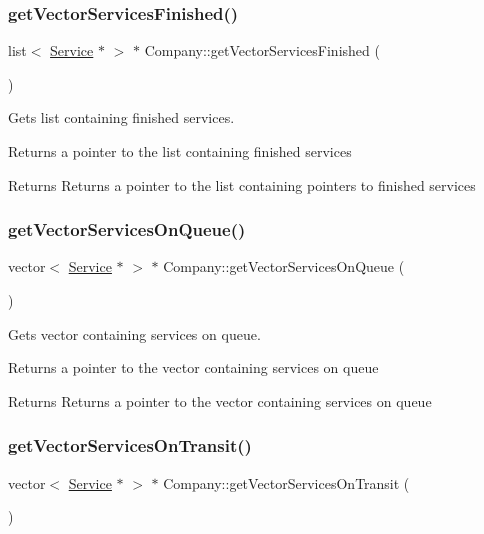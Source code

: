\subsubsection{\texorpdfstring{get\+Vector\+Services\+Finished()}{getVectorServicesFinished()}}
{\footnotesize\ttfamily list$<$ \hyperlink{class_service}{Service} $\ast$ $>$ $\ast$ Company\+::get\+Vector\+Services\+Finished (\begin{DoxyParamCaption}{ }\end{DoxyParamCaption})}



Gets list containing finished services. 

Returns a pointer to the list containing finished services

\begin{DoxyReturn}{Returns}
Returns a pointer to the list containing pointers to finished services 
\end{DoxyReturn}
\mbox{\label{class_company_adffe3680413d999c922858c88fbd18a6}} 
\subsubsection{\texorpdfstring{get\+Vector\+Services\+On\+Queue()}{getVectorServicesOnQueue()}}
{\footnotesize\ttfamily vector$<$ \hyperlink{class_service}{Service} $\ast$ $>$ $\ast$ Company\+::get\+Vector\+Services\+On\+Queue (\begin{DoxyParamCaption}{ }\end{DoxyParamCaption})}



Gets vector containing services on queue. 

Returns a pointer to the vector containing services on queue

\begin{DoxyReturn}{Returns}
Returns a pointer to the vector containing services on queue 
\end{DoxyReturn}
\mbox{\label{class_company_ab83ddbd16558f0e99efa7c56878e0ec8}} 
\subsubsection{\texorpdfstring{get\+Vector\+Services\+On\+Transit()}{getVectorServicesOnTransit()}}
{\footnotesize\ttfamily vector$<$ \hyperlink{class_service}{Service} $\ast$ $>$ $\ast$ Company\+::get\+Vector\+Services\+On\+Transit (\begin{DoxyParamCaption}{ }\end{DoxyParamCaption})}



